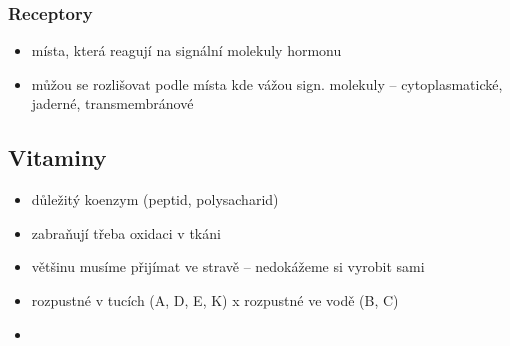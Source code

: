 \documentclass{article}
\begin{document}
\subsubsection{Receptory}
\begin{itemize}
  \item místa, která reagují na signální molekuly hormonu
  \item můžou se rozlišovat podle místa kde vážou sign. molekuly -- cytoplasmatické, jaderné, transmembránové
\end{itemize}

\subsection{Vitaminy}
\begin{itemize}
  \item důležitý koenzym (peptid, polysacharid)
  \item zabraňují třeba oxidaci v tkáni
  \item většinu musíme přijímat ve stravě -- nedokážeme si vyrobit sami
  \item rozpustné v tucích (A, D, E, K) x rozpustné ve vodě (B, C)
  \item
\end{itemize}
\end{document}
